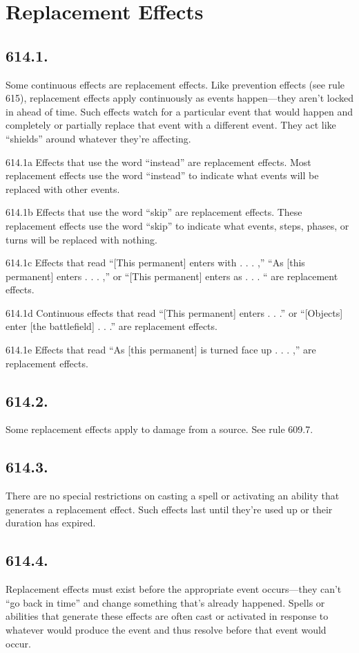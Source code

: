 \section{Replacement Effects}
\subsection*{614.1.}
Some continuous effects are replacement effects. Like prevention effects (see rule 615), replacement effects apply continuously as events happen—they aren’t locked in ahead of time. Such effects watch for a particular event that would happen and completely or partially replace that event with a different event. They act like “shields” around whatever they’re affecting.

614.1a Effects that use the word “instead” are replacement effects. Most replacement effects use the word “instead” to indicate what events will be replaced with other events.

614.1b Effects that use the word “skip” are replacement effects. These replacement effects use the word “skip” to indicate what events, steps, phases, or turns will be replaced with nothing.

614.1c Effects that read “[This permanent] enters with . . . ,” “As [this permanent] enters . . . ,” or “[This permanent] enters as . . . “ are replacement effects.

614.1d Continuous effects that read “[This permanent] enters . . .” or “[Objects] enter [the battlefield] . . .” are replacement effects.

614.1e Effects that read “As [this permanent] is turned face up . . . ,” are replacement effects.

\subsection*{614.2.}
Some replacement effects apply to damage from a source. See rule 609.7.

\subsection*{614.3.}
There are no special restrictions on casting a spell or activating an ability that generates a replacement effect. Such effects last until they’re used up or their duration has expired.

\subsection*{614.4.}
Replacement effects must exist before the appropriate event occurs—they can’t “go back in time” and change something that’s already happened. Spells or abilities that generate these effects are often cast or activated in response to whatever would produce the event and thus resolve before that event would occur.


